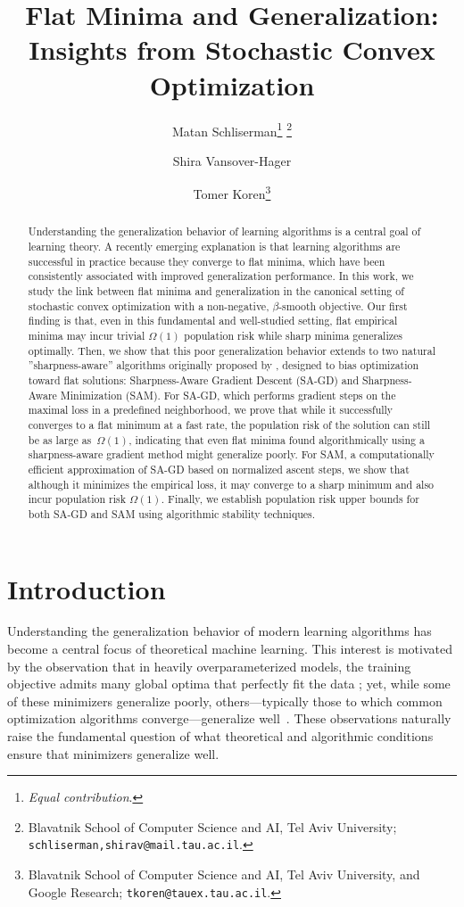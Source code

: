 \documentclass[11pt]{article}
\title{Flat Minima and Generalization: \\ Insights from Stochastic Convex Optimization}
\author{%
    Matan Schliserman\thanks{\emph{Equal contribution}.}\,\,\thanks{Blavatnik School of Computer Science and AI, Tel Aviv University; \texttt{schliserman,shirav@mail.tau.ac.il}.}
    \and%
    Shira Vansover-Hager\samethanks[1] \samethanks[2]
    \and%
    Tomer Koren\thanks{Blavatnik School of Computer Science and AI, Tel Aviv University, and Google Research; \texttt{tkoren@tauex.tau.ac.il}.}
}
\begin{document}
\maketitle


\begin{abstract}
Understanding the generalization behavior of learning algorithms is a central goal of learning theory. A recently emerging explanation is that learning algorithms are successful in practice because they converge to flat minima, which have been consistently associated with improved generalization performance. 
In this work, we study the link between flat minima and generalization in the canonical setting of stochastic convex optimization with a non-negative, $\beta$-smooth objective.
Our first finding is that, even in this fundamental and well-studied setting, flat empirical minima may incur trivial $\Omega(1)$ population risk while sharp minima generalizes optimally.
Then, we show that this poor generalization behavior extends to two natural ''sharpness-aware'' algorithms originally proposed by \citet{foret2021sharpness}, designed to bias optimization toward flat solutions: Sharpness-Aware Gradient Descent (SA-GD)
and Sharpness-Aware Minimization (SAM).
For SA-GD, which performs gradient steps on the maximal loss in a predefined neighborhood, we prove that while it successfully converges to a flat minimum at a fast rate, the population risk of the solution can still be as large as~$\Omega(1)$, indicating that even flat minima found algorithmically using a sharpness-aware gradient method might generalize poorly.
For SAM, a computationally efficient approximation of SA-GD based on normalized ascent steps, we show that although it minimizes the empirical loss, it may converge to a sharp minimum and also incur population risk $\Omega(1)$. 
Finally, we establish population risk upper bounds for both SA-GD and SAM using algorithmic stability techniques.
\end{abstract} 














\section{Introduction}
\label{sec:intro}
Understanding the generalization behavior of modern learning algorithms has become a central focus of theoretical machine learning. This interest is motivated by the observation that in heavily overparameterized models, the training objective admits many global optima that perfectly fit the data \citep{zhang2017understanding}; yet, while some of these minimizers generalize poorly, others---typically those to which common optimization algorithms converge---generalize well~\citep{neyshabur2014search, neyshabur2017exploring,zhang2017understanding}. These observations naturally raise the fundamental question of what theoretical and algorithmic conditions ensure that minimizers generalize well.
\end{document}
